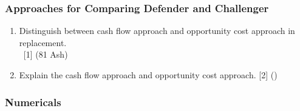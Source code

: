 \documentclass[12pt]{article}
\newcommand{\enter}{\\\textcolor{white}{1}}
\begin{document}
		\subsubsection{Approaches for Comparing Defender and Challenger}
			\begin{enumerate}
				\item Distinguish between cash flow approach and opportunity cost approach in replacement.
				\enter\hfill [1] (81 Ash)

				\item Explain the cash flow approach and opportunity cost approach. \hfill [2] ()
			\end{enumerate}

		\subsubsection{Numericals}
\end{document}

